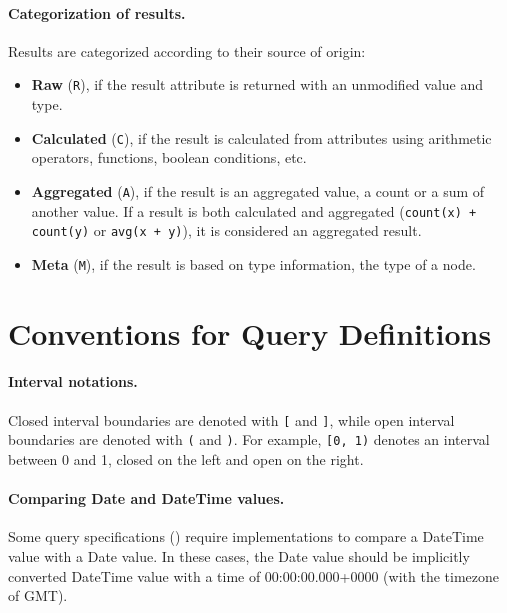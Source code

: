 \paragraph{Categorization of results.} Results are categorized according to their source of origin:

\begin{itemize}
	\item \textbf{Raw} (\texttt{R}), if the result attribute is returned with an unmodified value and type.
	\item \textbf{Calculated} (\texttt{C}), if the result is calculated from attributes using arithmetic operators, functions, boolean conditions, etc.
	\item \textbf{Aggregated} (\texttt{A}), if the result is an aggregated value, \eg a count or a sum of another value. If a result is both calculated and aggregated (\eg \lstinline{count(x) + count(y)} or \lstinline{avg(x + y)}), it is considered an aggregated result.
	\item \textbf{Meta} (\texttt{M}), if the result is based on type information, \eg the type of a node.
\end{itemize}



\section{Conventions for Query Definitions}

\paragraph{Interval notations.} Closed interval boundaries are denoted with 
\texttt{[} 
and \texttt{]}, while open interval boundaries are denoted with \texttt{(} and 
\texttt{)}. For example, \texttt{[0, 1)} denotes an interval between 0 and 1, 
closed on the left and open on the right.

\paragraph{Comparing Date and DateTime values.}

Some query specifications (\eg {}) require implementations to compare a
\textsf{DateTime} value with a \textsf{Date} value. In these cases, the 
\textsf{Date} value should be implicitly converted \textsf{DateTime} value 
with a time of 00:00:00.000+0000 (\ie with the timezone of GMT).

